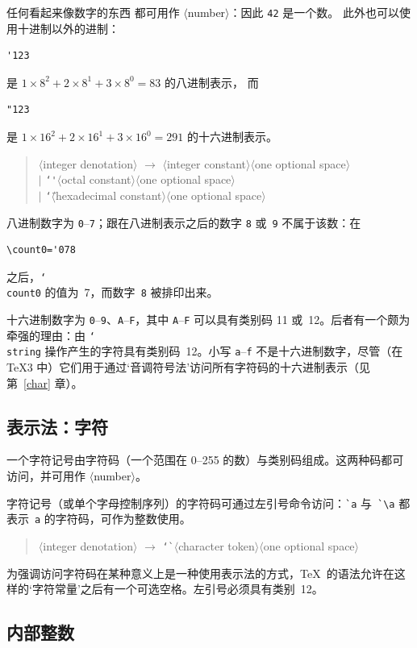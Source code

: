 \documentclass[a4paper]{rapport3}
\def\nl{\protect\\}\def\n#1{{\tt #1}}\def\cs#1{{\tt\char`\\#1}}\let\csc\cs
\def\gr#1{$\langle$#1$\rangle$}\def\key#1{{\tt#1}}
\newenvironment{disp}{\begin{quotation}}{\end{quotation}}
\begin{document}
任何看起来像数字的东西
都可用作 \gr{number}：因此 \verb-42- 是一个数。
此外也可以使用十进制以外的进制：
\begin{verbatim}
'123
\end{verbatim}
是 $1\times8^2+2\times8^1+3\times8^0=83$ 的八进制表示，
而
\begin{verbatim}
"123
\end{verbatim}
是 $1\times16^2+2\times16^1+3\times16^0=291$ 的十六进制表示。
\begin{disp}\gr{integer denotation} $\longrightarrow$
\gr{integer constant}\gr{one optional space} \nl
\indent $|$ \n{\char`\'}\gr{octal constant}\gr{one optional space}\nl
\indent $|$ \n{\char`\"}\gr{hexadecimal constant}\gr{one optional space}
\end{disp}
八进制数字为 \n0--\n7；跟在八进制表示之后的数字 \n8 或~\n9 不属于该数：在
\begin{verbatim}
\count0='078
\end{verbatim}
之后，\cs{count0} 的值为~7，而数字~\n8 被排印出来。

十六进制数字为 \n0--\n9、\n A--\n F，其中 \n A--\n F 可以具有类别码 11 或~12。后者有一个颇为牵强的理由：由 \cs{string} 操作产生的字符具有类别码~12。小写 \n a--\n f 不是十六进制数字，尽管（在 \TeX3 中）它们用于通过`音调符号法'访问所有字符码的十六进制表示（见第~\ref{char} 章）。

\subsection{表示法：字符}

一个字符记号由字符码（一个范围在 0--255 的数）与类别码组成。这两种码都可访问，并可用作 \gr{number}。
\awp

字符记号（或单个字母控制序列）的字符码可通过左引号命令访问：\verb-`a- 与~\verb-`\a- 都表示~{\tt a} 的字符码，可作为整数使用。
\begin{disp}\gr{integer denotation} $\longrightarrow$
\n{\char`\`}\gr{character token}\gr{one optional space}\end{disp}

为强调访问字符码在某种意义上是一种使用表示法的方式，\TeX\ 的语法允许在这样的`字符常量'之后有一个可选空格。左引号必须具有类别~12。

\subsection{内部整数}
\end{document}
